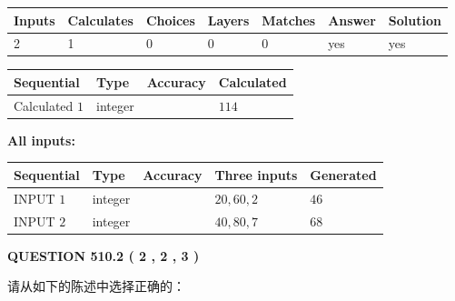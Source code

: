 \documentclass{ctexart}
\begin{document}
 
\noindent{}
 
 

 
   
   
   
   
\noindent\begin{tabular}{|l|l|l|l|l|l|l|}
 \hline
Inputs & Calculates & Choices & Layers & Matches & Answer & Solution \\ \hline
 2  & 
 1  & 
 0
  & 
 0  & 
 0  & 
  yes & 
  yes 
  \\ \hline
 \end{tabular}
   
   
   
   
\noindent{}
   
   
  
  
\noindent\begin{tabular}{|l|l|l|l|}
\hline
 Sequential & Type & Accuracy & Calculated \\ 
\hline
 
 
  Calculated $  1 $ & integer &  & 
  $ 114 $ 
 \\  \hline  
 \end{tabular}
   
   
   
   
\noindent\vspace{0.1in}\hspace{-0.08in} {\textbf{\Large{All inputs: }}}
   
   
  
  
\noindent\begin{tabular}{|l|l|l|l|l|}
\hline
 Sequential & Type & Accuracy & Three inputs & Generated \\ 
\hline
 
 
  INPUT $  1 $ & integer &  & $
 20
 , 
 60
 , 
 2
 $ & $ 46 $ 
 \\  \hline  
 
 
  INPUT $  2 $ & integer &  & $
 40
 , 
 80
 , 
 7
 $ & $ 68 $ 
 \\  \hline  
 \end{tabular}
   
   
  
\vspace{0.2in}
  
{\textbf{\Large{QUESTION
510.2 
 ( 2 , 2 , 3 )
}}}
  
  
请从如下的陈述中选择正确的：
 
\end{document}
